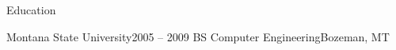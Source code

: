 

\section{\faGraduationCap}{Education}

  \resumeEntryStart
    \resumeEntryTSDL
      {Montana State University}{2005 -- 2009}
      {BS Computer Engineering}{Bozeman, MT}
  \resumeEntryEnd

